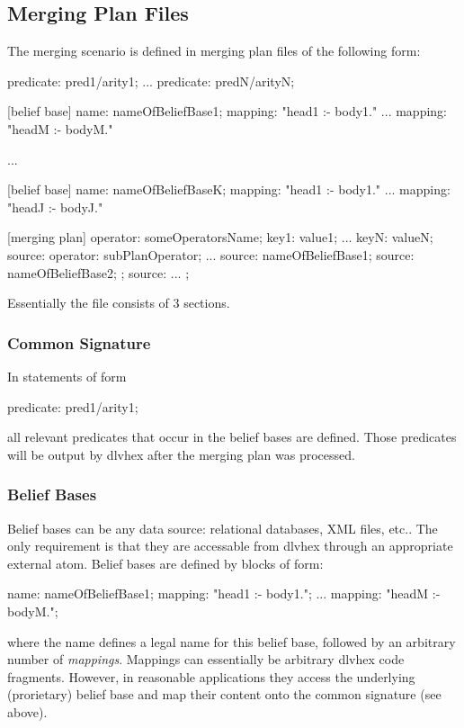 \documentclass[a4paper,11pt]{article}
\theoremstyle{definition}
\newcommand{\dlvhex}{\textsf{dlvhex}\xspace }
\newcommand{\inlinecode}[1]{\textsf{#1}\xspace }
\begin{document}
		\subsection{Merging Plan Files}
		\label{sec:RPCompiler:Files}
		
			The merging scenario is defined in merging plan files of the following form:
			
			\begin{exampleprogram}
predicate: pred1/arity1;
...
predicate: predN/arityN;

[belief base]
name: nameOfBeliefBase1;
mapping: "head1 :- body1."
...
mapping: "headM :- bodyM."

...

[belief base]
name: nameOfBeliefBaseK;
mapping: "head1 :- body1."
...
mapping: "headJ :- bodyJ."

[merging plan]
{
	operator: someOperatorsName;
	key1: value1;
	...
	keyN: valueN;
	source: {
		operator: subPlanOperator;
		...
		source: {nameOfBeliefBase1};
		source: {nameOfBeliefBase2};
	};
	source: {
		...
	};
}
			\end{exampleprogram}

			Essentially the file consists of 3 sections.
			
			\subsubsection{Common Signature}
			
				In statements of form
				\begin{center}
					\inlinecode{predicate: pred1/arity1;}
				\end{center}
				all relevant predicates that occur in the belief bases are defined. Those predicates will be output by \dlvhex after the merging plan was processed.

			\subsubsection{Belief Bases}
			
				Belief bases can be any data source: relational databases, XML files, etc.. The only requirement is that they are accessable from \dlvhex through an
				appropriate external atom. Belief bases are defined by blocks of form:
				\begin{exampleprogram}
name: nameOfBeliefBase1;
mapping: "head1 :- body1.";
...
mapping: "headM :- bodyM.";
				\end{exampleprogram}
				where the \inlinecode{name} defines a legal name for this belief base, followed by an arbitrary number of \emph{mappings}. Mappings can essentially be arbitrary \dlvhex
				code fragments. However, in reasonable applications they access the underlying (prorietary) belief base and map their content onto the common signature (see above).
				
\end{document}
